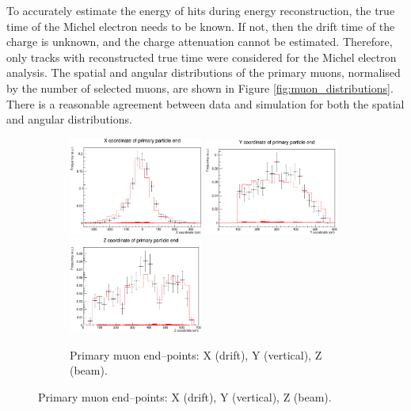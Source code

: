 To accurately estimate the energy of hits during energy reconstruction, the
true time of the Michel electron needs to be known. If not, then the drift 
time of the charge is unknown, and the charge attenuation cannot be estimated.
Therefore, only tracks with reconstructed true time were considered for the 
Michel electron analysis. The spatial and angular distributions of the primary 
muons, normalised by the number of selected muons, are shown in Figure 
\ref{fig:muon_distributions}. There is a reasonable agreement between data and 
simulation for both the spatial and angular distributions.
\begin{figure}

	\centering

	\begin{subfigure}[b]{\textwidth}
		\centering
		\includegraphics[width=0.484\textwidth]{figures/DataVMC_primary_EndX.pdf}
		\hfill
		\includegraphics[width=0.484\textwidth]{figures/DataVMC_primary_EndY.pdf}
		\includegraphics[width=0.484\textwidth]{figures/DataVMC_primary_EndZ.pdf}
		\caption {Primary muon end--points: X (drift), Y (vertical), Z (beam).}
		\label{fig:muon_endpoints}
	\end{subfigure}


\end{figure}

